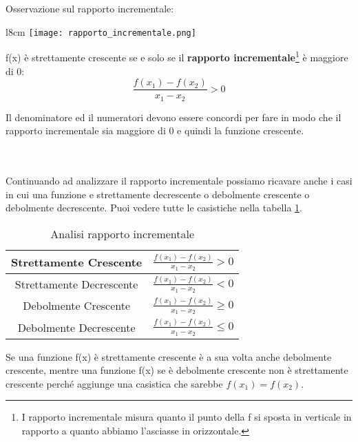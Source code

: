 \begin{observation}
    Osservazione sul rapporto incrementale:\\
\end{observation}
\begin{wrapfigure}[8]{l}{8cm}
    \vspace{-15pt}
    \centering
    \texttt{[image: rapporto\_incrementale.png]}
    \caption{$\frac{\Delta_y}{\Delta_x}$}
    \label{fig:esempio-invertibilità}
\end{wrapfigure}
f(x) è strettamente crescente se e solo se il \textbf{rapporto incrementale}\footnote{I rapporto incrementale misura quanto il punto della f si sposta in verticale in rapporto a quanto abbiamo l'asciasse in orizzontale.} è maggiore di 0:
\begin{equation}
    \frac{f(x_1) - f(x_2)}{x_1 - x_2} > 0
\end{equation}
\begin{note}
    Il denominatore ed il numeratori devono essere concordi per fare in modo che il rapporto incrementale sia maggiore di 0 e quindi la funzione crescente. \\ \\\\
\end{note}
Continuando ad analizzare il rapporto incrementale possiamo ricavare anche i casi in cui una funzione e strettamente decrescente o debolmente crescente o debolmente decrescente. Puoi vedere tutte le casistiche nella tabella \ref{tab:analisi-rapporto-incrementale}.
\begin{table}[h!]
    \centering
    \setlength{\tabcolsep}{7pt}
    \renewcommand{\arraystretch}{2}
    \begin{tabular}{|c|c|}
        \hline
        Strettamente Crescente & $\frac{f(x_1) - f(x_2)}{x_1 - x_2} > 0$\\ \hline
        Strettamente Decrescente & $\frac{f(x_1) - f(x_2)}{x_1 - x_2} < 0$ \\ \hline
        Debolmente Crescente & $\frac{f(x_1) - f(x_2)}{x_1 - x_2} \geq 0$ \\ \hline
        Debolmente Decrescente & $\frac{f(x_1) - f(x_2)}{x_1 - x_2} \leq 0$ \\ \hline
    \end{tabular}
    \caption{Analisi rapporto incrementale}
    \label{tab:analisi-rapporto-incrementale}
\end{table}
\begin{observation}
    Se una funzione f(x) è strettamente crescente è a sua volta anche debolmente crescente, mentre una funzione f(x) se è debolmente crescente non è strettamente crescente perché aggiunge una casistica che sarebbe $f(x_1) = f(x_2)$. 
\end{observation}
